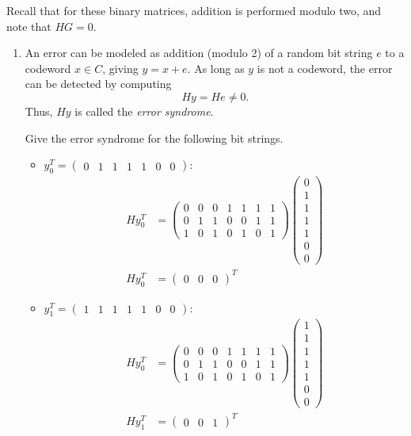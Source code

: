 Recall that for these binary matrices, addition is performed modulo two, and note that $HG=0$.

\begin{enumerate}
\item An error can be modeled as addition (modulo 2) of a random bit string $e$ to a codeword
$x\in C$, giving $y=x+e$. As long as $y$ is not a codeword, the error can be detected by computing
\begin{equation}
Hy = He \neq 0.
\end{equation}
Thus, $Hy$ is called the \emph{error syndrome}.

Give the error syndrome for the following bit strings. 
\begin{itemize}
    \item $y_0^{T} = \begin{pmatrix}0 & 1 & 1 & 1 & 1 & 0 & 0 \end{pmatrix}$: 
    \begin{align}
        H y_0^T &= \begin{pmatrix}
        0 & 0 & 0 & 1 & 1 & 1 & 1\\
        0 & 1 & 1 & 0 & 0 & 1 & 1\\
        1 & 0 & 1 & 0 & 1 & 0 & 1\end{pmatrix} \begin{pmatrix}0 \\ 1 \\ 1 \\ 1 \\ 1 \\ 0 \\ 0 \end{pmatrix} \\
        H y_0^T &= \begin{pmatrix} 0 & 0 & 0 \end{pmatrix}^T
    \end{align}

    \item $y_1^T = \begin{pmatrix} 1 & 1 & 1 & 1 & 1 & 0 & 0 \end{pmatrix}$:
    \begin{align}
        H y_0^T &= \begin{pmatrix}
        0 & 0 & 0 & 1 & 1 & 1 & 1\\
        0 & 1 & 1 & 0 & 0 & 1 & 1\\
        1 & 0 & 1 & 0 & 1 & 0 & 1\end{pmatrix} \begin{pmatrix} 1 \\ 1 \\ 1 \\ 1 \\ 1 \\ 0 \\ 0\end{pmatrix} \\
        H y_1^T &= \begin{pmatrix} 0 & 0 & 1 \end{pmatrix}^T
    \end{align}


\end{itemize}
\end{enumerate}
